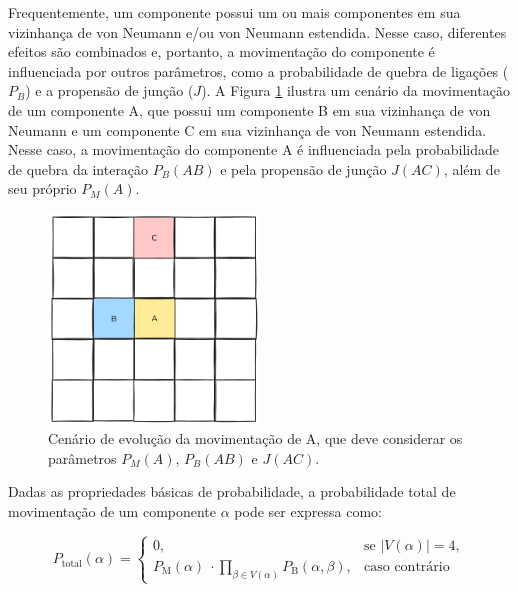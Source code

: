 \documentclass[12pt,oneside]{report}
\begin{document}
Frequentemente, um componente possui um ou mais componentes em sua vizinhança de von Neumann e/ou von Neumann estendida. Nesse caso, diferentes efeitos são combinados e, portanto, a movimentação do componente é influenciada por outros parâmetros, como a probabilidade de quebra de ligações (\hyperref[subsubsec:Pb]{$P_B$}) e a propensão de junção (\hyperref[subsubsec:J]{$J$}). A Figura \ref{fig:evolucao_Pm_Pb_J} ilustra um cenário da movimentação de um componente A, que possui um componente B em sua vizinhança de von Neumann e um componente C em sua vizinhança de von Neumann estendida. Nesse caso, a movimentação do componente A é influenciada pela probabilidade de quebra da interação $P_B (AB)$ e pela propensão de junção $J(AC)$, além de seu próprio $P_M (A)$.

\begin{figure}[H]
    \centering
    \includegraphics[width=0.5\textwidth]{evolucao_Pm_Pb_J.png}
    \caption{\small Cenário de evolução da movimentação de A, que deve considerar os parâmetros $P_M (A)$, $P_B (AB)$ e $J(AC)$.}
    \label{fig:evolucao_Pm_Pb_J}
\end{figure}

Dadas as propriedades básicas de probabilidade, a probabilidade total de movimentação de um componente $\alpha$ pode ser expressa como:

\begin{equation}
    \label{eq:pmov_total}
    P_\text{total}(\alpha) =
    \begin{cases}
        0,                                                                                            & \text{se } \left| V(\alpha) \right| = 4, \\[2ex]
        P_\text{M}(\alpha)\ \cdot \displaystyle\prod_{\beta \in V(\alpha)} P_\text{B}(\alpha, \beta), & \text{caso contrário}
    \end{cases}
\end{equation}
\end{document}
